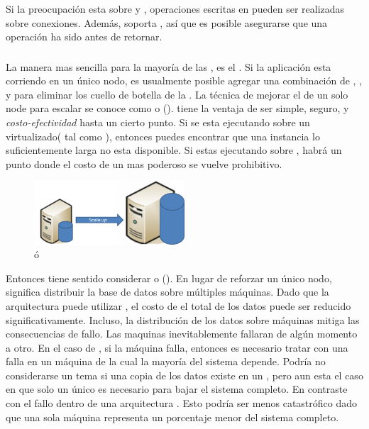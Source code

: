 Si la preocupación esta sobre \consistencyDB y \durabilityDB, operaciones escritas en \mongodbNAME pueden ser realizadas \consistencyDB sobre conexiones. Además,  soporta \nearRealTimeReplicationDB, así que es posible asegurarse que una operación ha sido \replicatedDB antes de retornar.

\subsubsection{\scalabilityQA}
La manera mas sencilla para \scale la mayoría de las \dataBasesDB, es \upgradingPC el \hardwarePC. Si la aplicación esta corriendo en un único nodo, es usualmente posible agregar una combinación de \diskPC \iopsPC, \memoryPC, y \cpuPC para eliminar los cuello de botella de la \dataBaseDB. La técnica de mejorar el \hardwarePC de un solo node para escalar se conoce como \verticalScalingDB o \scalingUpDB(). \verticalScalingDB tiene la ventaja de ser simple, seguro, y \textit{costo-efectividad} hasta un cierto punto. Si se esta ejecutando sobre un \hardwarePC virtualizado( tal como \amazonEcdosNAME), entonces puedes encontrar que una instancia lo suficientemente larga no esta disponible. Si estas ejecutando sobre \physHardwarePC, habrá un punto donde el costo de un \serverAS mas poderoso se vuelve prohibitivo.

\begin{figure}[h!]
	\centering
	\includegraphics[width=0.5\textwidth]{figuras/cap2/scale_up.png}
	\caption{\verticalScalingDB ó \scalingUpDB }
	\label{figure:figure_scale_up}
\end{figure}

Entonces tiene sentido  considerar \horizontalScalingDB o \scalingOutDB(). En lugar de reforzar un único nodo, \horizontalScalingDB significa distribuir la base de datos sobre múltiples máquinas. Dado que la arquitectura \horizontallyScaledDB puede utilizar \commodityHardwarePC, el costo de \hostingDB el total de los datos puede ser reducido significativamente. Incluso, la distribución  de los datos sobre máquinas mitiga las consecuencias de fallo. Las maquinas inevitablemente fallaran de algún momento a otro. En el caso de \verticalScalingDB , si la máquina falla, entonces es necesario tratar con una falla en un máquina de la cual la mayoría del sistema depende. Podría no considerarse un tema si una copia de los datos existe en un \replicatedSlaveDB, pero aun esta el caso en que solo un único \serverAS es necesario para bajar el sistema completo. En contraste con el fallo dentro de una arquitectura \horizontallyScaledDB. Esto podría ser menos catastrófico dado que una sola máquina representa un porcentaje menor del sistema completo.

